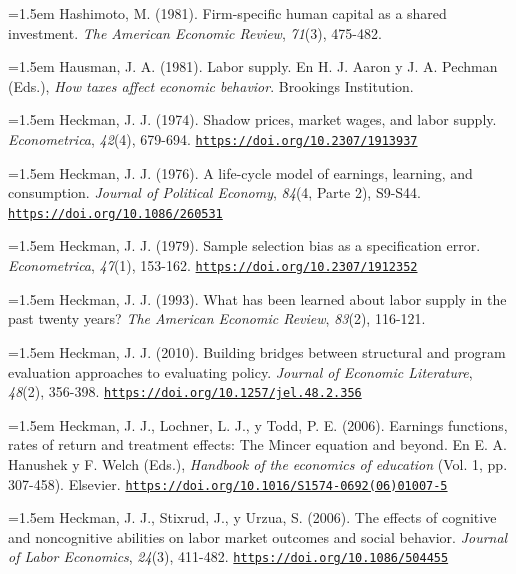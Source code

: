 \documentclass[10pt,a4paper]{article}
\begin{document}
\noindent\hangindent=1.5em Hashimoto, M. (1981). Firm-specific human capital as a shared investment. \textit{The American Economic Review}, \textit{71}(3), 475-482.

\noindent\hangindent=1.5em Hausman, J. A. (1981). Labor supply. En H. J. Aaron y J. A. Pechman (Eds.), \textit{How taxes affect economic behavior}. Brookings Institution.

\noindent\hangindent=1.5em Heckman, J. J. (1974). Shadow prices, market wages, and labor supply. \textit{Econometrica}, \textit{42}(4), 679-694. \href{https://doi.org/10.2307/1913937}{\nolinkurl{https://doi.org/10.2307/1913937}}

\noindent\hangindent=1.5em Heckman, J. J. (1976). A life-cycle model of earnings, learning, and consumption. \textit{Journal of Political Economy}, \textit{84}(4, Parte 2), S9-S44. \href{https://doi.org/10.1086/260531}{\nolinkurl{https://doi.org/10.1086/260531}}

\noindent\hangindent=1.5em Heckman, J. J. (1979). Sample selection bias as a specification error. \textit{Econometrica}, \textit{47}(1), 153-162. \href{https://doi.org/10.2307/1912352}{\nolinkurl{https://doi.org/10.2307/1912352}}

\noindent\hangindent=1.5em Heckman, J. J. (1993). What has been learned about labor supply in the past twenty years? \textit{The American Economic Review}, \textit{83}(2), 116-121.

\noindent\hangindent=1.5em Heckman, J. J. (2010). Building bridges between structural and program evaluation approaches to evaluating policy. \textit{Journal of Economic Literature}, \textit{48}(2), 356-398. \href{https://doi.org/10.1257/jel.48.2.356}{\nolinkurl{https://doi.org/10.1257/jel.48.2.356}}

\noindent\hangindent=1.5em Heckman, J. J., Lochner, L. J., y Todd, P. E. (2006). Earnings functions, rates of return and treatment effects: The Mincer equation and beyond. En E. A. Hanushek y F. Welch (Eds.), \textit{Handbook of the economics of education} (Vol. 1, pp. 307-458). Elsevier. \href{https://doi.org/10.1016/S1574-0692(06)01007-5}{\nolinkurl{https://doi.org/10.1016/S1574-0692(06)01007-5}}

\noindent\hangindent=1.5em Heckman, J. J., Stixrud, J., y Urzua, S. (2006). The effects of cognitive and noncognitive abilities on labor market outcomes and social behavior. \textit{Journal of Labor Economics}, \textit{24}(3), 411-482. \href{https://doi.org/10.1086/504455}{\nolinkurl{https://doi.org/10.1086/504455}}
\end{document}
